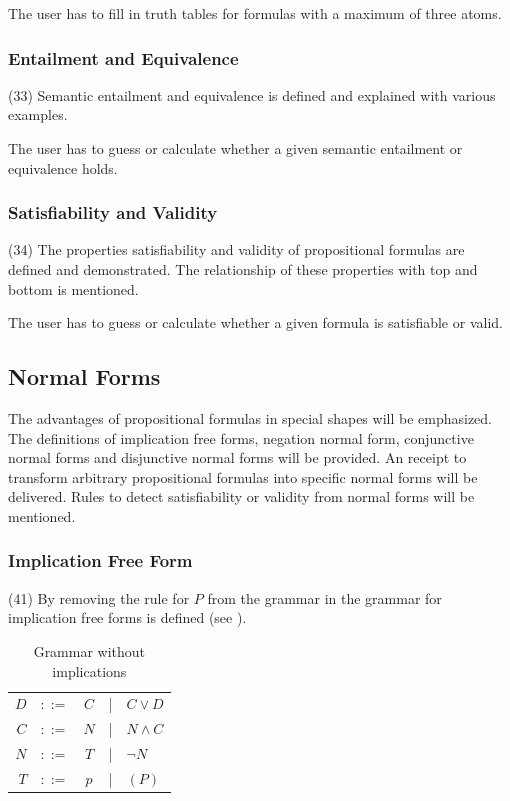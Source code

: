 The user has to fill in truth tables for formulas with a maximum of three atoms.

\subsubsection{Entailment and Equivalence}
\label{tut:33}
(33) Semantic entailment and equivalence is defined and explained with various examples.

The user has to guess or calculate whether a given semantic entailment or equivalence holds. 

\subsubsection{Satisfiability and Validity}
\label{tut:34}
(34) The properties satisfiability and validity of propositional formulas are defined and demonstrated. 
The relationship of these properties with top and bottom is mentioned. 

The user has to guess or calculate whether a given formula is satisfiable or valid.

\subsection{Normal Forms}

The advantages of propositional formulas in special shapes will be emphasized.
The definitions of implication free forms, negation normal form, 
conjunctive normal forms and disjunctive normal forms will be provided. 
An receipt to transform arbitrary propositional formulas into specific normal forms will be delivered.
Rules to detect satisfiability or validity from normal forms will be mentioned.

\subsubsection{Implication Free Form}
\label{tut:41}
(41)
By removing the rule for $P$ from the grammar in  
the grammar for implication free forms is defined  
(see ). 

\begin{table}[htdp]
\begin{center}
\begin{tabular}{rcccl}
$D$		&$::=$ & $C$ &|& $C \vee D$			\\
$C$		&$::=$ & $N$ &|& $N \wedge C$ 		\\
$N$		&$::=$ & $T$ &|& $\neg N$ 			\\
$T$		&$::=$ & $p$ &|& $(P)$
\end{tabular}
\caption{Grammar without implications}
\label{tab:BNFGRIFF}
\end{center}
\end{table}

